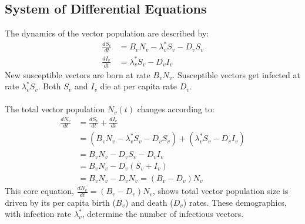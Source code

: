 \subsection*{System of Differential Equations}
The dynamics of the vector population are described by:
\begin{align} 
\frac{dS_v}{dt} &= B_v N_v - \lambda_v^* S_v - D_v S_v \label{eq:clemente_dSv_simplified} \\
\frac{dI_v}{dt} &= \lambda_v^* S_v - D_v I_v \label{eq:clemente_dIv_simplified}
\end{align}
New susceptible vectors are born at rate $B_v N_v$. Susceptible vectors get infected at rate $\lambda_v^* S_v$. Both $S_v$ and $I_v$ die at per capita rate $D_v$.
\\\\
The total vector population $N_v(t)$ changes according to:
\begin{align*} %
\frac{dN_v}{dt} &= \frac{dS_v}{dt} + \frac{dI_v}{dt} \\
               &= (B_v N_v - \lambda_v^* S_v - D_v S_v) + (\lambda_v^* S_v - D_v I_v) \\
               &= B_v N_v - D_v S_v - D_v I_v \\
               &= B_v N_v - D_v (S_v + I_v) \\
               &= B_v N_v - D_v N_v = (B_v - D_v)N_v
\end{align*}
This core equation, $\frac{dN_v}{dt} = (B_v - D_v)N_v$, shows total vector population size is driven by its per capita birth ($B_v$) and death ($D_v$) rates. These demographics, with infection rate $\lambda_v^*$, determine the number of infectious vectors.

